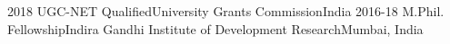 %
%
%


\begin{achievments}

  \experience
    {2018}   {UGC-NET Qualified}{University Grants Commission}{India}
    {} {}
  \experience
    {2016-18}   {M.Phil. Fellowship}{Indira Gandhi Institute of Development Research}{Mumbai, India}
    {} {}
\end{achievments}